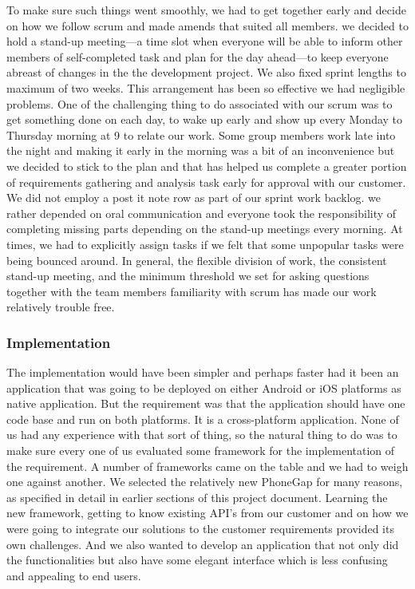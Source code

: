 To make sure such things went smoothly, we had to get together early and decide on how we follow scrum and made amends that suited all members. we decided to hold a stand-up meeting---a time slot when everyone will be able to inform other members of self-completed task and plan for the day ahead---to keep everyone abreast of changes in the the development project. We also fixed sprint lengths to maximum of two weeks. This arrangement has been so effective we had negligible problems. One of the challenging thing to do associated with our scrum was to get something done on each day, to wake up early and show up every Monday to Thursday morning at 9 to relate our work. Some group members work late into the night and making it early in the morning was a bit of an inconvenience but we decided to stick to the plan and that has helped us complete a greater portion of requirements gathering and analysis task early for approval with our customer. We did not employ a post it note row as part of our sprint work backlog. we rather depended on oral communication and everyone took the responsibility of completing missing parts depending on the stand-up meetings every morning. At times, we had to explicitly assign tasks if we felt that some unpopular tasks were being bounced around. In general, the flexible division of work, the consistent stand-up meeting, and the minimum threshold we set for asking questions together with the team members familiarity with scrum has made our work relatively trouble free.
	\subsubsection{Implementation}
The implementation would have been simpler and perhaps faster had it been an application that was going to be deployed on either Android or iOS platforms as native application. 
But the requirement was that the application should have one code base and run on both platforms. 
It is a cross-platform application. 
None of us had any experience with that sort of thing, so the natural thing to do was to make sure every one of us evaluated some framework for the implementation of the requirement. 
A number of frameworks came on the table and we had to weigh one against another. 
We selected the relatively new PhoneGap for many reasons, as specified in detail in earlier sections of this project document. 
Learning the new framework, getting to know existing API's from our customer and on how we were going to integrate our solutions to the customer requirements provided its own challenges. 
And we also wanted to develop an application that not only did the functionalities but also have some elegant interface which is less confusing and appealing to end users.

